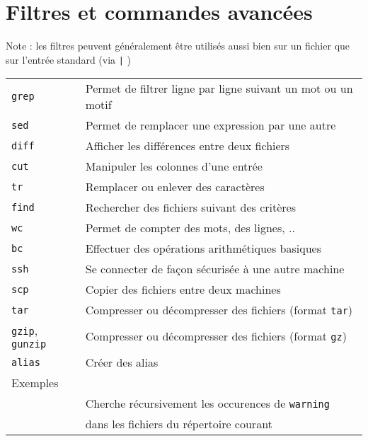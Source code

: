 \documentclass [a4paper]{article}
\begin{document}
\section*{Filtres et commandes avancées}

Note : les filtres peuvent généralement être utilisés aussi bien sur un fichier que sur l'entrée standard (via \og \verb+|+ \fg{})
\begin{tabular}{ ll }
\hline
{\verb+grep+}                                    & Permet de filtrer ligne par ligne suivant un mot ou un motif\\
{\verb+sed+}                                     & Permet de remplacer une expression par une autre\\
{\verb+diff+}                                    & Afficher les différences entre deux fichiers\\
{\verb+cut+}                                     & Manipuler les colonnes d'une entrée\\
{\verb+tr+}                                      & Remplacer ou enlever des caractères\\
{\verb+find+}                                    & Rechercher des fichiers suivant des critères\\
{\verb+wc+}                                      & Permet de compter des mots, des lignes, ..\\
{\verb+bc+}                                      & Effectuer des opérations arithmétiques basiques\\
{\verb+ssh+}                                     & Se connecter de façon sécurisée à une autre machine\\
{\verb+scp+}                                     & Copier des fichiers entre deux machines \\
{\verb+tar+}                                     & Compresser ou décompresser des fichiers (format \verb+tar+)\\
{\verb+gzip+, \verb+gunzip+}                     & Compresser ou décompresser des fichiers (format \verb+gz+)\\
{\verb+alias+}                                   & Créer des alias\\
\hline
Exemples                                         & \\
\hspace{0.5cm}{\verb+grep -nr "warning" ./+}              & Cherche récursivement les occurences de \verb+warning+\\
                                                          & dans les fichiers du répertoire courant\\

\end{tabular}
\end{document}
